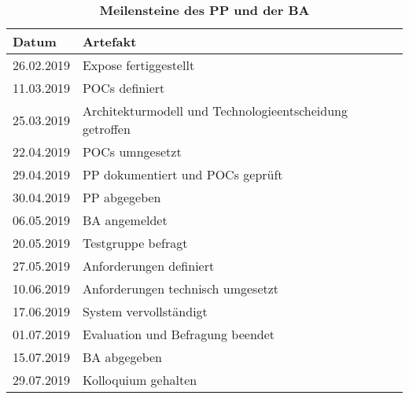 \documentclass[12pt,titlepage]{scrartcl}
\begin{document}
\begin{table}[H]
\centering
\caption{\textbf{Meilensteine des PP und der BA}}
\begin{tabular}{|c|l|}
\hline
\multicolumn{1}{|l|}{\textbf{Datum}} & {\textbf{Artefakt}} \\ \hline
26.02.2019                                 & Expose fertiggestellt \\ \hline
11.03.2019                                 & POCs definiert\\ \hline
25.03.2019                                       & Architekturmodell und Technologieentscheidung getroffen \\ \hline
22.04.2019                                       & POCs umngesetzt                                  \\ \hline
29.04.2019                                       & PP dokumentiert und POCs geprüft                                \\ \hline
30.04.2019                                       & PP abgegeben\\ \hline
06.05.2019                                       & BA angemeldet \\ \hline
20.05.2019                                       & Testgruppe befragt \\ \hline
27.05.2019                                       & Anforderungen definiert \\ \hline
10.06.2019                                       & Anforderungen technisch umgesetzt\\ \hline
17.06.2019                                       & System vervollständigt \\ \hline
01.07.2019                                       & Evaluation und Befragung beendet \\ \hline
15.07.2019                                       & BA abgegeben \\ \hline
29.07.2019                                       & Kolloquium gehalten \\ \hline
\end{tabular}
\end{table}

\newpage


 	
\end{document}
